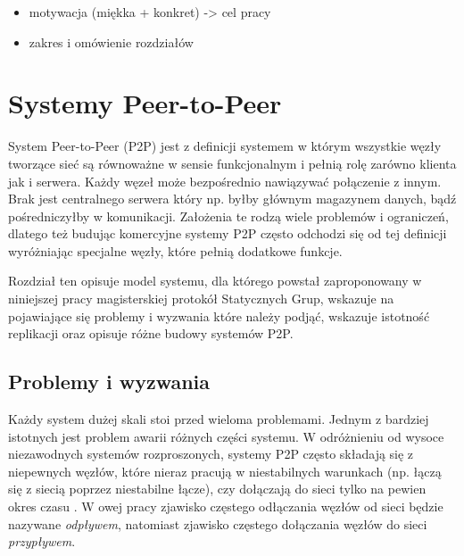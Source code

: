 \documentclass[12pt, twoside, openany]{report}
\begin{document}
\begin{itemize}
\item motywacja (miękka + konkret) -> cel pracy
\item zakres i omówienie rozdziałów
\end{itemize}


\chapter{Systemy Peer-to-Peer}

System Peer-to-Peer (P2P) \cite{bib:martins, bib:jeyasheeli, bib:chord} jest z definicji systemem w którym wszystkie węzły tworzące sieć są równoważne w sensie funkcjonalnym i pełnią rolę zarówno klienta jak i serwera. Każdy węzeł może bezpośrednio nawiązywać połączenie z innym. Brak jest centralnego serwera który np. byłby głównym magazynem danych, bądź pośredniczyłby w komunikacji. Założenia te rodzą wiele problemów i ograniczeń, dlatego też budując komercyjne systemy P2P często odchodzi się od tej definicji wyróżniając specjalne węzły, które pełnią dodatkowe funkcje.

Rozdział ten opisuje model systemu, dla którego powstał zaproponowany w niniejszej pracy magisterskiej protokół Statycznych Grup, wskazuje na pojawiające się problemy i wyzwania które należy podjąć, wskazuje istotność replikacji oraz opisuje różne budowy systemów P2P.

\section{Problemy i wyzwania}

Każdy system dużej skali stoi przed wieloma problemami. Jednym z bardziej istotnych jest problem awarii różnych części systemu. W odróżnieniu od wysoce niezawodnych systemów rozproszonych, systemy P2P często składają się z niepewnych węzłów, które nieraz pracują w niestabilnych warunkach (np. łączą się z siecią poprzez niestabilne łącze), czy dołączają do sieci tylko na pewien okres czasu \cite{bib:paiva}. W owej pracy zjawisko częstego odłączania węzłów od sieci będzie nazywane \textit{odpływem}, natomiast zjawisko częstego dołączania węzłów do sieci \textit{przypływem}.
\end{document}
